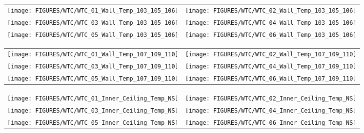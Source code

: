 \begin{figure}[p]
\begin{tabular*}{\textwidth}{l@{\extracolsep{\fill}}r}
\texttt{[image: FIGURES/WTC/WTC\_01\_Wall\_Temp\_103\_105\_106]} &
\texttt{[image: FIGURES/WTC/WTC\_02\_Wall\_Temp\_103\_105\_106]} \\
\texttt{[image: FIGURES/WTC/WTC\_03\_Wall\_Temp\_103\_105\_106]} &
\texttt{[image: FIGURES/WTC/WTC\_04\_Wall\_Temp\_103\_105\_106]} \\
\texttt{[image: FIGURES/WTC/WTC\_05\_Wall\_Temp\_103\_105\_106]} &
\texttt{[image: FIGURES/WTC/WTC\_06\_Wall\_Temp\_103\_105\_106]}
\end{tabular*}
\label{NIST_WTC_Wall_103_105_106}
\end{figure}

\begin{figure}[p]
\begin{tabular*}{\textwidth}{l@{\extracolsep{\fill}}r}
\texttt{[image: FIGURES/WTC/WTC\_01\_Wall\_Temp\_107\_109\_110]} &
\texttt{[image: FIGURES/WTC/WTC\_02\_Wall\_Temp\_107\_109\_110]} \\
\texttt{[image: FIGURES/WTC/WTC\_03\_Wall\_Temp\_107\_109\_110]} &
\texttt{[image: FIGURES/WTC/WTC\_04\_Wall\_Temp\_107\_109\_110]} \\
\texttt{[image: FIGURES/WTC/WTC\_05\_Wall\_Temp\_107\_109\_110]} &
\texttt{[image: FIGURES/WTC/WTC\_06\_Wall\_Temp\_107\_109\_110]}
\end{tabular*}
\label{NIST_WTC_Wall_107_109_110}
\end{figure}

\begin{figure}[p]
\begin{tabular*}{\textwidth}{l@{\extracolsep{\fill}}r}
\texttt{[image: FIGURES/WTC/WTC\_01\_Inner\_Ceiling\_Temp\_NS]} &
\texttt{[image: FIGURES/WTC/WTC\_02\_Inner\_Ceiling\_Temp\_NS]} \\
\texttt{[image: FIGURES/WTC/WTC\_03\_Inner\_Ceiling\_Temp\_NS]} &
\texttt{[image: FIGURES/WTC/WTC\_04\_Inner\_Ceiling\_Temp\_NS]} \\
\texttt{[image: FIGURES/WTC/WTC\_05\_Inner\_Ceiling\_Temp\_NS]} &
\texttt{[image: FIGURES/WTC/WTC\_06\_Inner\_Ceiling\_Temp\_NS]}
\end{tabular*}
\label{NIST_WTC_Inner_Ceiling_NS}
\end{figure}

